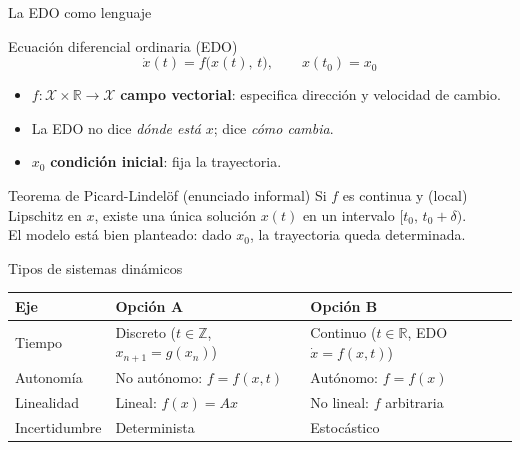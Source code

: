 \documentclass[aspectratio=169,10pt]{beamer}
\newcommand{\R}{\mathbb{R}}
\begin{document}
\begin{frame}{La EDO como lenguaje}
\vspace{4pt}
\begin{defbox}{Ecuaci\'on diferencial ordinaria (EDO)}
\[
  \dot{x}(t) = f\!\bigl(x(t),\,t\bigr), \qquad x(t_0) = x_0
\]
\begin{itemize}
  \item $f:\mathcal{X}\times\R\to\mathcal{X}$  \textbf{campo vectorial}:
        especifica direcci\'on y velocidad de cambio.
  \item La EDO no dice \emph{d\'onde est\'a} $x$; dice \emph{c\'omo cambia}.
  \item $x_0$  \textbf{condici\'on inicial}: fija la trayectoria.
\end{itemize}
\end{defbox}

\vspace{8pt}
\begin{resultbox}{Teorema de Picard-Lindel\"of (enunciado informal)}
Si $f$ es continua y (local) Lipschitz en $x$, existe una \'unica soluci\'on
$x(t)$ en un intervalo $[t_0,\,t_0+\delta)$.\\[3pt]
\textcolor{textgray}{\small
El modelo est\'a bien planteado: dado $x_0$, la trayectoria queda determinada.}
\end{resultbox}
\end{frame}

\begin{frame}{Tipos de sistemas din\'amicos}
\vspace{4pt}
\begin{center}
\renewcommand{\arraystretch}{1.45}
\begin{tabular}{lll}
\toprule
\textbf{Eje} & \textbf{Opci\'on A} & \textbf{Opci\'on B} \\
\midrule
Tiempo       & Discreto ($t\in\mathbb{Z}$,\; $x_{n+1}=g(x_n)$)
             & Continuo ($t\in\R$,\; EDO $\dot{x}=f(x,t)$) \\
Autonom\'ia  & No aut\'onomo:\; $f=f(x,t)$
             & Aut\'onomo:\; $f=f(x)$ \\
Linealidad   & Lineal:\; $f(x)=Ax$
             & No lineal:\; $f$ arbitraria \\
Incertidumbre& Determinista
             & Estoc\'astico \\
\bottomrule
\end{tabular}
\end{center}
\end{frame}
\end{document}
